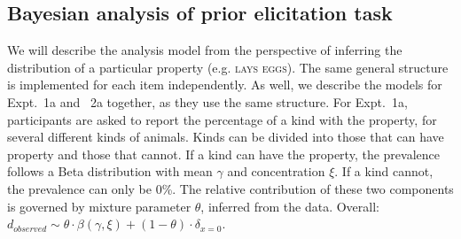 \documentclass{pnastwo}
\begin{document}
\begin{article}
\begin{materials}
%

\subsection{Bayesian analysis of prior elicitation task}
We will describe the analysis model from the perspective of inferring the distribution of a particular property (e.g. \textsc{lays eggs}). 
The same general structure is implemented for each item independently. 
As well, we describe the models for Expt.~1a and ~2a together, as they use the same structure. 
For Expt.~1a, participants are asked to report the percentage of a kind with the property, for several different kinds of animals.
Kinds can be divided into those that can have property and those that cannot.
If a kind can have the property, the prevalence follows a Beta distribution with mean $\gamma$ and concentration $\xi$. 
If a kind cannot, the prevalence can only be 0\%.
The relative contribution of these two components is governed by mixture parameter $\theta$, inferred from the data.
Overall: 
$ d_{observed}   \sim \theta \cdot \beta(\gamma,\xi)+ (1 - \theta) \cdot \delta_{x=0} $.


\end{materials}
\end{article}
\end{document}
